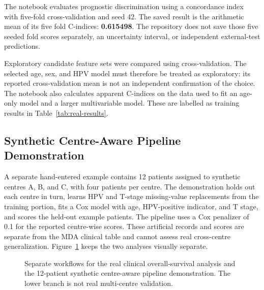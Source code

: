 \documentclass[conference]{IEEEtran}
\begin{document}
The notebook evaluates prognostic discrimination using a concordance index~\cite{harrell1982} with five-fold cross-validation and seed 42. The saved result is the arithmetic mean of its five fold C-indices: \textbf{0.615498}. The repository does not save those five seeded fold scores separately, an uncertainty interval, or independent external-test predictions.

Exploratory candidate feature sets were compared using cross-validation. The selected age, sex, and HPV model must therefore be treated as exploratory: its reported cross-validation mean is not an independent confirmation of the choice. The notebook also calculates apparent C-indices on the data used to fit an age-only model and a larger multivariable model. These are labelled as training results in Table~\ref{tab:real-results}.

\subsection{Synthetic Centre-Aware Pipeline Demonstration}
A separate hand-entered example contains 12 patients assigned to synthetic centres A, B, and C, with four patients per centre. The demonstration holds out each centre in turn, learns HPV and T-stage missing-value replacements from the training portion, fits a Cox model with age, HPV-positive indicator, and T stage, and scores the held-out example patients. The pipeline uses a Cox penalizer of 0.1 for the reported centre-wise scores. These artificial records and scores are separate from the MDA clinical table and cannot assess real cross-centre generalization. Figure~\ref{fig:workflow} keeps the two analyses visually separate.

\begin{figure}[t]
\centering
{}
\caption{Separate workflows for the real clinical overall-survival analysis and the 12-patient synthetic centre-aware pipeline demonstration. The lower branch is not real multi-centre validation.}
\label{fig:workflow}
\end{figure}
\end{document}
